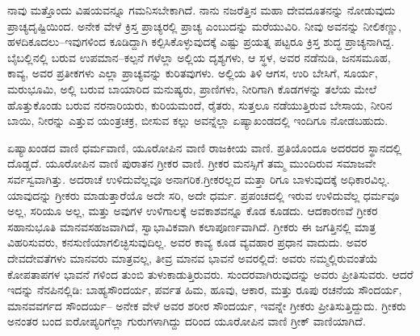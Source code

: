 ನಾವು ಮತ್ತೊಂದು ವಿಷಯವನ್ನೂ ಗಮನಿಸಬೇಕಾಗಿದೆ. ನಾನು ನಜರೆತ್ತಿನ ಮಹಾ ದೇವದೂತನನ್ನು ನೋಡುವುದು ಪ್ರಾಚ್ಯದೃಷ್ಟಿಯಿಂದ. ಅನೇಕ ವೇಳೆ ಕ್ರಿಸ್ತ ಪ್ರಾಚ್ಯರಲ್ಲಿ ಪ್ರಾಚ್ಯ ಎಂಬುದನ್ನು ಮರೆಯುವಿರಿ. ನೀವು ಅವನನ್ನು ನೀಲಿಕಣ್ಣು, ಹಳದಿಕೂದಲು–\break ಇವುಗಳಿಂದ ಕೂಡಿದ್ದಾಗಿ ಕಲ್ಪಿಸಿಕೊಳ್ಳುವುದಕ್ಕೆ ಎಷ್ಟು ಪ್ರಯತ್ನ ಪಟ್ಟರೂ ಕ್ರಿಸ್ತ ಶುದ್ಧ ಪ್ರಾಚ್ಯನಾಗಿದ್ದ. ಬೈಬಲ್ಲಿನಲ್ಲಿ ಬರುವ ಉಪಮಾನ–ಕಲ್ಪನೆ ಗಳೆಲ್ಲಾ ಅಲ್ಲಿಯ ದೃಶ್ಯಗಳು, ಆ ಸ್ಥಳ, ಅವರ ನಡೆನುಡಿ, ಜನಸಮೂಹ, ಕಾವ್ಯ, ಅವರ ಪ್ರತೀಕಗಳು ಎಲ್ಲಾ ಪ್ರಾಚ್ಯವನ್ನು ಕುರಿತವುಗಳು. ಅಲ್ಲಿಯ ತಿಳಿ ಆಗಸ, ಉರಿ ಬೇಸಿಗೆ, ಸೂರ್ಯ, ಮರುಭೂಮಿ, ಅಲ್ಲಿ ಬರುವ ಬಾಯಾರಿದ ಮನುಷ್ಯರು, ಪ್ರಾಣಿಗಳು, ನೀರಿಗಾಗಿ ಕೊಡಗಳನ್ನು ತಲೆಯ ಮೇಲೆ ಹೊತ್ತುಕೊಂಡು ಬರುವ ನರನಾರಿಯರು, ಕುರಿಯಮಂದೆ, ರೈತರು, ಸುತ್ತಲೂ ನಡೆಯುತ್ತಿರುವ ಬೇಸಾಯ, ನೀರಿನ ಬಾಯಿ, ನೀರನ್ನು ಎತ್ತುವ ಯಂತ್ರಚಕ್ರ, ಬೀಸುವ ಕಲ್ಲು ಅವನ್ನೆಲ್ಲಾ ಏಷ್ಯಾಖಂಡದಲ್ಲಿ ಇಂದಿಗೂ ನೋಡಬಹುದು.

ಏಷ್ಯಾಖಂಡದ ವಾಣಿ ಧರ್ಮವಾಣಿ, ಯೂರೋಪಿನ ವಾಣಿ ರಾಜಕೀಯ ವಾಣಿ. ಪ್ರತಿಯೊಂದೂ ಅದರದರ ಸ್ಥಾನದಲ್ಲಿ ದೊಡ್ಡದೆ. ಯೂರೋಪಿನ ವಾಣಿ ಪುರಾತನ ಗ್ರೀಕರ ವಾಣಿ. ಗ್ರೀಕರ ಮನಸ್ಸಿಗೆ ತಮ್ಮ ಮುಂದಿರುವ ಸಮಾಜವೇ ಸರ್ವಸ್ವವಾಗಿತ್ತು. ಅದರಾಚೆ ಉಳಿದುವೆಲ್ಲವೂ ಅನಾಗರಿಕ.ಗ್ರೀಕರಲ್ಲದ ಮತ್ತಾ ರಿಗೂ ಬಾಳುವುದಕ್ಕೆ ಅಧಿಕಾರವಿಲ್ಲ. ಯಾವುದನ್ನು ಗ್ರೀಕರು ಮಾಡುತ್ತಾರೆಯೊ ಅದೇ ಸರಿ, ಅದೇ ಧರ್ಮ. ಪ್ರಪಂಚದಲ್ಲಿ ಇರುವ ಉಳಿದುವೆಲ್ಲ ಧರ್ಮವೂ ಅಲ್ಲ, ಸರಿಯೂ ಅಲ್ಲ, ಮತ್ತು ಅವುಗಳ ಉಳಿಗಾಲಕ್ಕೆ ಅವಕಾಶವನ್ನೂ ಕೊಡ ಕೂಡದು. ಆದಕಾರಣವೆ ಗ್ರೀಕರ ಸಹಾನುಭೂತಿ ಮಾನವ\break ಸಹಜವಾಗಿದೆ, ಸ್ವಾಭಾವಿಕವಾಗಿ ಕಲಾಪೂರ್ಣವಾಗಿದೆ. ಗ್ರೀಕರು ಈ ಜಗತ್ತಿನಲ್ಲಿ ಮಾತ್ರ ವಿಹರಿಸುವರು, ಕನಸುಣಿಯಾಗಲಿಚ್ಛಿಸುವುದಿಲ್ಲ. ಅವರ ಕಾವ್ಯ ಕೂಡ ವ್ಯವಹಾರ ಪ್ರಧಾನ ವಾದುದು. ಅವರ ದೇವದೇವತೆಗಳು ಮಾನವರು ಮಾತ್ರವಲ್ಲ, ತೀವ್ರ ಮಾನವ ಭಾವನೆ ಅವರಲ್ಲಿದೆ: ಅವರು ನಮ್ಮಲ್ಲಿರುವಂತೆಯೆ ಕೋಪತಾಪಗಳ ಭಾವನೆ ಗಳಿಂದ ತುಂಬಿ ತುಳುಕಾಡುತ್ತಿರುವರು. ಸುಂದರವಾಗಿರುವುದನ್ನು ಅವರು ಪ್ರೀತಿಸುವರು. ಆದರೆ ಇದನ್ನು ನೆನಪಿನಲ್ಲಿಡಿ: ಬಾಹ್ಯಸೌಂದರ್ಯ, ಪರ್ವತ ಹಿಮ, ಹೂವು, ಆಕಾರ, ಮತ್ತು ರೂಪು ರಚನೆಯ ಸೌಂದರ್ಯ, ಮಾನವವರ್ಗದ ಸೌಂದರ್ಯ– ಅನೇಕ ವೇಳೆ ಅವರ ಶರೀರ ಸೌಂದರ್ಯ, ಇವನ್ನೇ ಗ್ರೀಕರು ಪ್ರೀತಿಸುತ್ತಿದ್ದುದು. ಗ್ರೀಕರು ಅನಂತರ ಬಂದ ಐರೋಪ್ಯರಿಗೆಲ್ಲಾ ಗುರುಗಳಾಗಿದ್ದು ದರಿಂದ ಯೂರೋಪಿನ ವಾಣಿ ಗ್ರೀಕ್​ ವಾಣಿಯಾಗಿದೆ.

